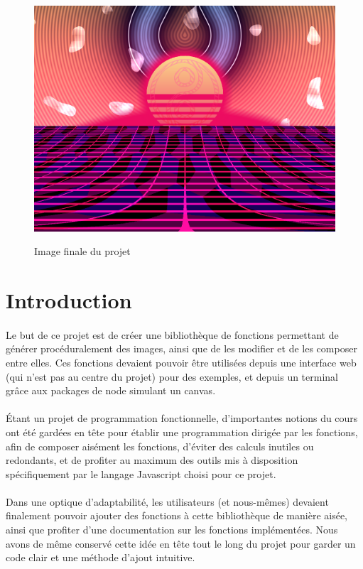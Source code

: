 \documentclass[a4paper]{article}
\begin{document}
\begin{figure}[hb]
    \centering ~\\[2cm]
    \includegraphics[width=0.8\columnwidth]{finalimage.png}
    \caption{Image finale du projet}
    \label{fig:finalimage}
\end{figure}

\newpage

\section{Introduction}

\paragraph{}
Le but de ce projet\cite{sujet} est de créer une bibliothèque de fonctions permettant de générer procéduralement des images, ainsi que de les modifier et de les composer entre elles. Ces fonctions devaient pouvoir être utilisées depuis une interface web (qui n'est pas au centre du projet) pour des exemples, et depuis un terminal grâce aux packages de node simulant un canvas.

\paragraph{}
Étant un projet de programmation fonctionnelle, d'importantes notions du cours\cite{cours} ont été gardées en tête pour établir une programmation dirigée par les fonctions, afin de composer aisément les fonctions, d'éviter des calculs inutiles ou redondants, et de profiter au maximum des outils mis à disposition spécifiquement par le langage Javascript choisi pour ce projet.

\paragraph{}
Dans une optique d'adaptabilité, les utilisateurs (et nous-mêmes) devaient finalement pouvoir ajouter des fonctions à cette bibliothèque de manière aisée, ainsi que profiter d'une documentation sur les fonctions implémentées. Nous avons de même conservé cette idée en tête tout le long du projet pour garder un code clair et une méthode d'ajout intuitive.
\end{document}
